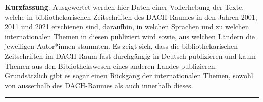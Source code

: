 \textbf{Kurzfassung}: Ausgewertet werden hier Daten einer Vollerhebung
der Texte, welche in bibliothekarischen Zeitschriften des DACH-Raumes in
den Jahren 2001, 2011 und 2021 erschienen sind, daraufhin, in welchen
Sprachen und zu welchen internationalen Themen in diesen publiziert wird
sowie, aus welchen Ländern die jeweiligen Autor*innen stammten. Es zeigt
sich, dass die bibliothekarischen Zeitschriften im DACH-Raum fast
durchgängig in Deutsch publizieren und kaum Themen aus den
Bibliothekswesen eines anderen Landes publizieren. Grundsätzlich gibt es
sogar einen Rückgang der internationalen Themen, sowohl von ausserhalb
des DACH-Raumes als auch innerhalb dieses.

\begin{center}\rule{0.5\linewidth}{0.5pt}\end{center}
